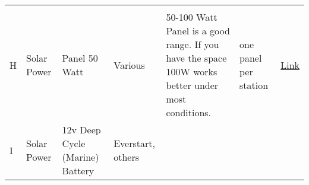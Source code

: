 \documentclass[
]{article}
\begin{document}
\begin{longtable}[]{@{}lllllll@{}}
\begin{minipage}[t]{0.12\columnwidth}
\strut
\end{minipage} & \begin{minipage}[t]{0.12\columnwidth}\raggedright
\strut
\end{minipage}\tabularnewline
\begin{minipage}[t]{0.12\columnwidth}\raggedright
H\strut
\end{minipage} & \begin{minipage}[t]{0.12\columnwidth}\raggedright
Solar Power\strut
\end{minipage} & \begin{minipage}[t]{0.12\columnwidth}\raggedright
Panel 50 Watt\strut
\end{minipage} & \begin{minipage}[t]{0.12\columnwidth}\raggedright
Various\strut
\end{minipage} & \begin{minipage}[t]{0.12\columnwidth}\raggedright
50-100 Watt Panel is a good range. If you have the space 100W works
better under most conditions.\strut
\end{minipage} & \begin{minipage}[t]{0.12\columnwidth}\raggedright
one panel per station\strut
\end{minipage} & \begin{minipage}[t]{0.12\columnwidth}\raggedright
\href{https://www.amazon.com/Newpowa-Polycrystalline-Efficiency-Module-Marine/dp/B0725RZ22H/ref=sr_1_9?keywords=100\%2Bwatt\%2Bsolar\&qid=1552483408\&s=lawn-garden\&sr=1-9\&th=1}{Link}\strut
\end{minipage}\tabularnewline
\begin{minipage}[t]{0.12\columnwidth}\raggedright
I\strut
\end{minipage} & \begin{minipage}[t]{0.12\columnwidth}\raggedright
Solar Power\strut
\end{minipage} & \begin{minipage}[t]{0.12\columnwidth}\raggedright
12v Deep Cycle (Marine) Battery\strut
\end{minipage} & \begin{minipage}[t]{0.12\columnwidth}\raggedright
Everstart, others\strut
\end{minipage} & \begin{minipage}[t]{0.12\columnwidth}\raggedright
\strut
\end{minipage} & \begin{minipage}[t]{0.12\columnwidth}\raggedright
\strut
\end{minipage} & \begin{minipage}[t]{0.12\columnwidth}\raggedright

\end{minipage}
\end{longtable}
\end{document}
